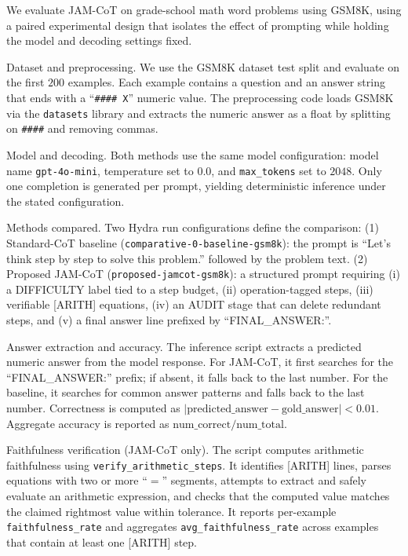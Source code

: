 \documentclass[journal,article,submit,pdftex,moreauthors]{Definitions/mdpi}
\begin{document}
We evaluate JAM-CoT on grade-school math word problems using GSM8K, using a paired experimental design that isolates the effect of prompting while holding the model and decoding settings fixed.

Dataset and preprocessing. We use the GSM8K dataset test split and evaluate on the first $200$ examples. Each example contains a question and an answer string that ends with a ``\verb|#### X|'' numeric value. The preprocessing code loads GSM8K via the \verb|datasets| library and extracts the numeric answer as a float by splitting on \verb|####| and removing commas.

Model and decoding. Both methods use the same model configuration: model name \verb|gpt-4o-mini|, temperature set to $0.0$, and \verb|max_tokens| set to $2048$. Only one completion is generated per prompt, yielding deterministic inference under the stated configuration.

Methods compared. Two Hydra run configurations define the comparison:
(1) Standard-CoT baseline (\verb|comparative-0-baseline-gsm8k|): the prompt is ``Let’s think step by step to solve this problem.'' followed by the problem text.
(2) Proposed JAM-CoT (\verb|proposed-jamcot-gsm8k|): a structured prompt requiring (i) a DIFFICULTY label tied to a step budget, (ii) operation-tagged steps, (iii) verifiable [ARITH] equations, (iv) an AUDIT stage that can delete redundant steps, and (v) a final answer line prefixed by ``FINAL\_ANSWER:''.

Answer extraction and accuracy. The inference script extracts a predicted numeric answer from the model response. For JAM-CoT, it first searches for the ``FINAL\_ANSWER:'' prefix; if absent, it falls back to the last number. For the baseline, it searches for common answer patterns and falls back to the last number. Correctness is computed as $\lvert\text{predicted\_answer} - \text{gold\_answer}\rvert < 0.01$. Aggregate accuracy is reported as $\text{num\_correct} / \text{num\_total}$.

Faithfulness verification (JAM-CoT only). The script computes arithmetic faithfulness using \verb|verify_arithmetic_steps|. It identifies [ARITH] lines, parses equations with two or more ``$=$'' segments, attempts to extract and safely evaluate an arithmetic expression, and checks that the computed value matches the claimed rightmost value within tolerance. It reports per-example \verb|faithfulness_rate| and aggregates \verb|avg_faithfulness_rate| across examples that contain at least one [ARITH] step.
\end{document}
